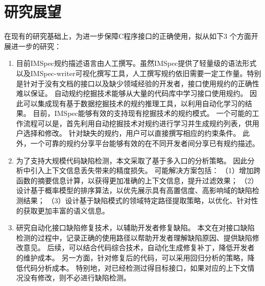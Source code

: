 \section{研究展望}
\label{sec:5.2}
在现有的研究基础上，为进一步保障C程序接口的正确使用，拟从如下3 个方面开展进一步的研究：
\begin{enumerate}
	\item 目前IMSpec规约描述语言由人工撰写。虽然IMSpec提供了轻量级的语法形式以及IMSpec-writer可视化撰写工具，人工撰写规约依旧需要一定工作量。特别是针对于没有文档的接口以及缺少领域经验的开发者，接口使用规约的正确性难以保证。
	自动规约挖掘技术能够从大量的代码库中学习接口使用规约。
	因此可以集成现有基于数据挖掘技术的规约推理工具，以利用自动化学习的结果。
	目前，IMSpec能够有效的支持现有挖掘技术的规约模式。
	一个可能的工作流程可以是，首先利用自动挖掘技术对规约进行学习并生成规约列表，供用户选择和修改。
	针对缺失的规约，用户可以直接撰写相应的约束条件。
	此外，一个可靠的规约分享平台能够有效的在不同开发者间分享已有规约描述。
	
	\item 为了支持大规模代码缺陷检测，本文采取了基于多入口的分析策略。
	因此分析中引入上下文信息丢失带来的精度损失。
	可能解决方案包括：
	（1）增加跨函数的摘要信息计算，以获得更加准确的上下文信息，提升过滤效果；
	（2）设计基于概率模型的排序算法，以优先展示具有高置信度、高影响域的缺陷检测结果；
	（3）设计基于缺陷模式的领域特定路径提取策略，以优化、针对性的获取更加丰富的语义信息。
	
	
	\item 研究自动化接口缺陷修复技术，以辅助开发者修复缺陷。
	本文在对接口缺陷检测的过程中，记录正确的使用路径以帮助开发者理解缺陷原因、提供缺陷修改意见。
	后续，可以结合代码综合技术，自动化生成修复补丁，降低开发者的维护成本。
	另一方面，针对修复后的代码，可以采用回归分析的策略，降低代码分析成本。
	特别地，对已经检测过得目标接口，如果对应的上下文情况没有修改，则不必进行缺陷检测。
\end{enumerate}
